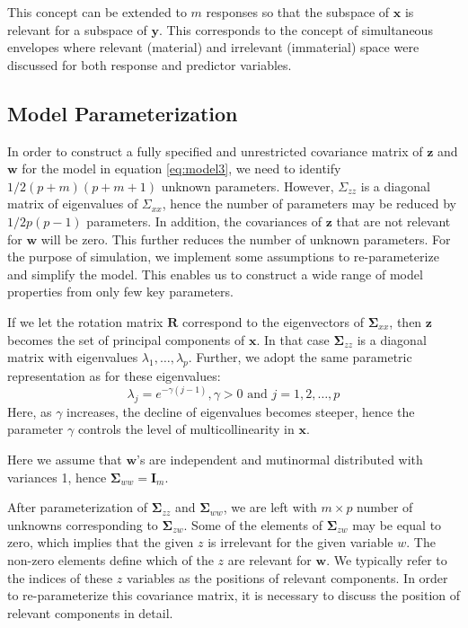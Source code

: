 \documentclass[num-refs]{wiley-article}
\providecommand{\tightlist}{%
  \setlength{\itemsep}{0pt}\setlength{\parskip}{0pt}}
\begin{document}
This concept can be extended to \(m\) responses so that the subspace of
\(\mathbf{x}\) is relevant for a subspace of \(\mathbf{y}\). This
corresponds to the concept of simultaneous envelopes
\citep{cook2015simultaneous} where relevant (material) and irrelevant
(immaterial) space were discussed for both response and predictor
variables.

\subsection{Model Parameterization}\label{model-parameterization}

In order to construct a fully specified and unrestricted covariance
matrix of \(\mathbf{z}\) and \(\mathbf{w}\) for the model in equation
\eqref{eq:model3}, we need to identify \(1/2 (p+m)(p+m+1)\) unknown
parameters. {\color{red}However, \(\Sigma_{zz}\) is a diagonal matrix of
eigenvalues of \(\Sigma_{xx}\), hence the number of parameters may be
reduced by \(1/2p(p-1)\) parameters. In addition, the covariances of
\(\mathbf{z}\) that are not relevant for \(\mathbf{w}\) will be zero.
This further reduces the number of unknown parameters.} For the purpose
of simulation, we implement some assumptions to re-parameterize and
simplify the model. This enables us to construct a wide range of model
properties from only few key parameters.

\begin{description}
\tightlist
\item[\textbf{Parameterization of \(\boldsymbol{\Sigma}_{zz}\)}]
If we let the rotation matrix \(\mathbf{R}\) correspond to the
eigenvectors of \(\boldsymbol{\Sigma}_{xx}\), then \(\mathbf{z}\)
becomes the set of principal components of \(\mathbf{x}\). In that case
\(\boldsymbol{\Sigma}_{zz}\) is a diagonal matrix with eigenvalues
\(\lambda_1, \ldots, \lambda_p\). Further, we adopt the same parametric
representation as \citet{saebo2015simrel} for these eigenvalues:
\[\lambda_j = e^{-\gamma(j - 1)}, \gamma >0 \text{ and } j = 1, 2, \ldots, p\]
Here, as \(\gamma\) increases, the decline of eigenvalues becomes
steeper, hence the parameter \(\gamma\) controls the level of
multicollinearity in \(\mathbf{x}\).
\item[\textbf{Parameterization of \(\boldsymbol{\Sigma}_{ww}\)}]
Here we assume that \(\mathbf{w}\)'s are independent and mutinormal
distributed with variances 1, hence
\(\boldsymbol{\Sigma}_{ww} = \mathbf{I}_m\).
\item[\textbf{Parameterization of \(\boldsymbol{\Sigma}_{zw}\)}]
After parameterization of \(\boldsymbol{\Sigma}_{zz}\) and
\(\boldsymbol{\Sigma}_{ww}\), we are left with \(m \times p\) number of
unknowns corresponding to \(\boldsymbol{\Sigma}_{zw}\). Some of the
elements of \(\boldsymbol{\Sigma}_{zw}\) may be equal to zero, which
implies that the given \(z\) is irrelevant for the given variable \(w\).
The non-zero elements define which of the \(z\) are relevant for
\(\mathbf{w}\). We typically refer to the indices of these \(z\)
variables as the positions of relevant components. In order to
re-parameterize this covariance matrix, it is necessary to discuss the
position of relevant components in detail.
\end{description}
\end{document}
